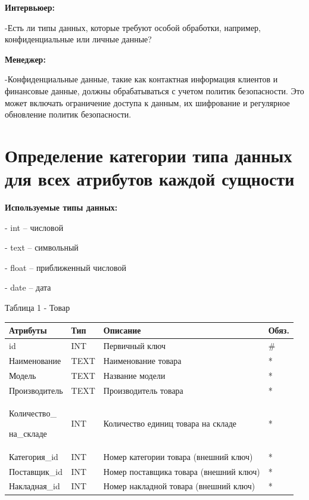 \documentclass[14pt]{extreport}
\begin{document}
\textbf{Интервьюер:}

-Есть ли типы данных, которые требуют особой обработки, например, конфиденциальные или личные данные?


\textbf{Менеджер:}

-Конфиденциальные данные, такие как контактная информация клиентов и финансовые данные, должны обрабатываться с учетом политик безопасности. Это может включать ограничение доступа к данным, их шифрование и регулярное обновление политик безопасности.




\section{Определение категории типа данных для всех атрибутов каждой сущности}

\textbf{Используемые типы данных:}


- int – числовой


- text – символьный


- float – приближенный числовой


- date – дата

\vspace{1em}
\noindent
Таблица 1 - Товар
\begin{center}
\begin{longtable}{ |m{3.3cm}|m{3cm}|m{6cm}|m{1.8cm}| } 
 \hline
 Атрибуты & Тип & Описание & Обяз. \\ [0.5ex] 
 \hline\hline
 id & INT & Первичный ключ & \# \\
 \hline
 Наименование & TEXT & Наименование товара & * \\
 \hline
 Модель & TEXT & Название модели & * \\
 \hline
 Производитель & TEXT & Производитель товара & *\\ 
 \hline
 Количество\_
 
 на\_складе & INT & Количество единиц товара на складе & * \\
 \hline
 Категория\_id & INT & Номер категории товара (внешний ключ) & * \\ 
 \hline
 Поставщик\_id & INT & Номер поставщика товара (внешний ключ) & * \\ 
 \hline
 Накладная\_id & INT & Номер накладной товара (внешний ключ) & * \\ 
 \hline

 \hline
\end{longtable}
\end{center}
\end{document}
